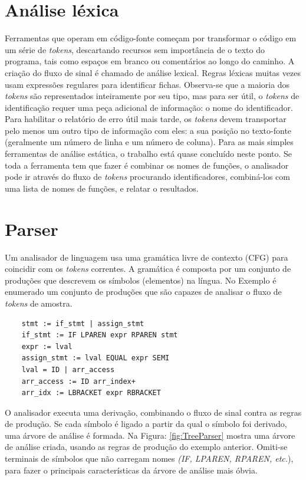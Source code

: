 	\section {Análise léxica}
	
	Ferramentas que operam em código-fonte começam por transformar o código em um série de {\it tokens}, descartando recursos sem importância de o texto do programa, tais como espaços em branco ou comentários ao longo do caminho. A criação do fluxo de sinal é chamado de análise lexical. Regras léxicas muitas vezes usam expressões regulares para identificar fichas.
	Observa-se que a maioria dos {\it tokens} são representados inteiramente por seu tipo, mas para ser útil, o {\it tokens} de identificação requer uma peça adicional de informação: o nome do identificador. Para habilitar o relatório de erro útil mais tarde, os {\it tokens} devem transportar pelo menos um outro tipo de informação com eles: a sua posição no texto-fonte (geralmente um número de linha e um número de coluna). Para as mais simples ferramentas de análise estática, o trabalho está quase concluído neste ponto. Se toda a ferramenta tem que fazer é combinar os nomes de funções, o analisador pode ir através do fluxo de {\it tokens} procurando identificadores, combiná-los com uma lista de nomes de funções, e relatar o resultados.\\
	
	\section{Parser}
	
	Um analisador de linguagem usa uma gramática livre de contexto (CFG) para coincidir com os {\it tokens} correntes. A gramática é composta por um conjunto de produções que descrevem os símbolos (elementos) na língua. No Exemplo é enumerado um conjunto de produções que são capazes de analisar o fluxo de {\it tokens} de amostra.
	
	\begin{lstlisting}
	stmt := if_stmt | assign_stmt
	if_stmt := IF LPAREN expr RPAREN stmt
	expr := lval
	assign_stmt := lval EQUAL expr SEMI
	lval = ID | arr_access
	arr_access := ID arr_index+
	arr_idx := LBRACKET expr RBRACKET
	\end{lstlisting}
	
	O analisador executa uma derivação, combinando o fluxo de sinal contra as regras de produção. Se cada símbolo é ligado a partir da qual o símbolo foi derivado, uma árvore de análise é formada. Na Figura: \ref{fig:TreeParser} mostra uma árvore de análise criada, usando as regras de produção do exemplo anterior. Omiti-se terminais de símbolos que não carregam nomes \textit{(IF, LPAREN, RPAREN, etc.}), para fazer o principais características da árvore de análise mais óbvia.\\
	
